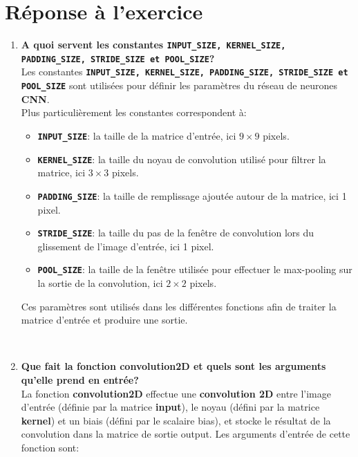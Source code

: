 \section{Réponse à l'exercice}
\begin{enumerate}
  \item {
    \textbf{A quoi servent les constantes \lstinline{INPUT_SIZE, KERNEL_SIZE, PADDING_SIZE, STRIDE_SIZE et POOL_SIZE}?} \vspace{0.2cm}\\
    Les constantes \textbf{\lstinline{INPUT_SIZE, KERNEL_SIZE, PADDING_SIZE, STRIDE_SIZE et POOL_SIZE}} sont utilisées pour définir les paramètres du réseau de neurones \textbf{CNN}. \\
    Plus particulièrement les constantes correspondent à:
    \begin{itemize}
      \item \textbf{\lstinline{INPUT_SIZE}}: la taille de la matrice d'entrée, ici $9 \times 9$ pixels.
      \item \textbf{\lstinline{KERNEL_SIZE}}: la taille du noyau de convolution utilisé pour filtrer la matrice, ici $3 \times 3$ pixels.
      \item \textbf{\lstinline{PADDING_SIZE}}: la taille de remplissage ajoutée autour de la matrice, ici 1 pixel.
      \item \textbf{\lstinline{STRIDE_SIZE}}: la taille du pas de la fenêtre de convolution lors du glissement de l'image d'entrée, ici 1 pixel.
      \item \textbf{\lstinline{POOL_SIZE}}: la taille de la fenêtre utilisée pour effectuer le max-pooling sur la sortie de la convolution, ici $2 \times 2$ pixels.
    \end{itemize}
    Ces paramètres sont utilisés dans les différentes fonctions afin de traiter la matrice d'entrée et produire une sortie.
  } \\\newpage
  \item {
    \textbf{Que fait la fonction convolution2D et quels sont les arguments qu'elle prend en entrée?} \vspace{0.2cm}\\ 
    La fonction \textbf{convolution2D} effectue une \textbf{convolution 2D} entre l'image d'entrée (définie par la matrice \textbf{input}), le noyau (défini par la matrice \textbf{kernel}) et un biais (défini par le scalaire bias), et stocke le résultat de la convolution dans la matrice de sortie output.
    Les arguments d'entrée de cette fonction sont:
    \begin{itemize}

\end{itemize}}
\end{enumerate}
